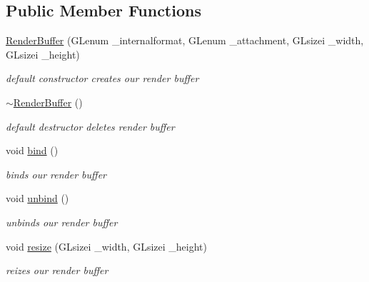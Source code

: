 \subsection*{Public Member Functions}
\begin{DoxyCompactItemize}
\item 
\hypertarget{class_render_buffer_ac3494e7208c1b9fee4e0ff61b24d38ee}{\hyperlink{class_render_buffer_ac3494e7208c1b9fee4e0ff61b24d38ee}{Render\-Buffer} (G\-Lenum \-\_\-internalformat, G\-Lenum \-\_\-attachment, G\-Lsizei \-\_\-width, G\-Lsizei \-\_\-height)}\label{class_render_buffer_ac3494e7208c1b9fee4e0ff61b24d38ee}

\begin{DoxyCompactList}\small\item\em default constructor creates our render buffer \end{DoxyCompactList}\item 
\hypertarget{class_render_buffer_a19e7ab6e01523fffea6d5415510889d6}{\hyperlink{class_render_buffer_a19e7ab6e01523fffea6d5415510889d6}{$\sim$\-Render\-Buffer} ()}\label{class_render_buffer_a19e7ab6e01523fffea6d5415510889d6}

\begin{DoxyCompactList}\small\item\em default destructor deletes render buffer \end{DoxyCompactList}\item 
\hypertarget{class_render_buffer_ae0ae7cf1d85a6a4bee741a0132b2b8ab}{void \hyperlink{class_render_buffer_ae0ae7cf1d85a6a4bee741a0132b2b8ab}{bind} ()}\label{class_render_buffer_ae0ae7cf1d85a6a4bee741a0132b2b8ab}

\begin{DoxyCompactList}\small\item\em binds our render buffer \end{DoxyCompactList}\item 
\hypertarget{class_render_buffer_aacb6894f0d626da9e35c383674be7f86}{void \hyperlink{class_render_buffer_aacb6894f0d626da9e35c383674be7f86}{unbind} ()}\label{class_render_buffer_aacb6894f0d626da9e35c383674be7f86}

\begin{DoxyCompactList}\small\item\em unbinds our render buffer \end{DoxyCompactList}\item 
void \hyperlink{class_render_buffer_a7dfe2482e11ec51c8ebd687d9ff0a045}{resize} (G\-Lsizei \-\_\-width, G\-Lsizei \-\_\-height)
\begin{DoxyCompactList}\small\item\em reizes our render buffer \end{DoxyCompactList}\end{DoxyCompactItemize}
